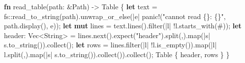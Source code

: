\documentclass[
  10pt,
]{article}
\newenvironment{Shaded}{}{}
\newcommand{\CharTok}[1]{\textcolor[rgb]{0.25,0.44,0.63}{#1}}
\newcommand{\DataTypeTok}[1]{\textcolor[rgb]{0.56,0.13,0.00}{#1}}
\newcommand{\KeywordTok}[1]{\textcolor[rgb]{0.00,0.44,0.13}{\textbf{#1}}}
\newcommand{\NormalTok}[1]{#1}
\newcommand{\OperatorTok}[1]{\textcolor[rgb]{0.40,0.40,0.40}{#1}}
\newcommand{\PreprocessorTok}[1]{\textcolor[rgb]{0.74,0.48,0.00}{#1}}
\newcommand{\StringTok}[1]{\textcolor[rgb]{0.25,0.44,0.63}{#1}}
\begin{document}
\begin{Shaded}
\begin{Highlighting}[]
\KeywordTok{fn}\NormalTok{ read\_table(path}\OperatorTok{:} \OperatorTok{\&}\DataTypeTok{Path}\NormalTok{) }\OperatorTok{{-}\textgreater{}}\NormalTok{ Table }\OperatorTok{\{}
    \KeywordTok{let}\NormalTok{ text }\OperatorTok{=} \PreprocessorTok{fs::}\NormalTok{read\_to\_string(path)}\OperatorTok{.}\NormalTok{unwrap\_or\_else(}\OperatorTok{|}\NormalTok{e}\OperatorTok{|} \PreprocessorTok{panic!}\NormalTok{(}\StringTok{"cannot read \{\}: \{\}"}\OperatorTok{,}\NormalTok{ path}\OperatorTok{.}\NormalTok{display()}\OperatorTok{,}\NormalTok{ e))}\OperatorTok{;}
    \KeywordTok{let} \KeywordTok{mut}\NormalTok{ lines }\OperatorTok{=}\NormalTok{ text}\OperatorTok{.}\NormalTok{lines()}\OperatorTok{.}\NormalTok{filter(}\OperatorTok{|}\NormalTok{l}\OperatorTok{|} \OperatorTok{!}\NormalTok{l}\OperatorTok{.}\NormalTok{starts\_with(}\CharTok{\textquotesingle{}\#\textquotesingle{}}\NormalTok{))}\OperatorTok{;}
    \KeywordTok{let}\NormalTok{ header}\OperatorTok{:} \DataTypeTok{Vec}\OperatorTok{\textless{}}\DataTypeTok{String}\OperatorTok{\textgreater{}} \OperatorTok{=}\NormalTok{ lines}\OperatorTok{.}\NormalTok{next()}\OperatorTok{.}\NormalTok{expect(}\StringTok{"header"}\NormalTok{)}\OperatorTok{.}\NormalTok{split(}\CharTok{\textquotesingle{},\textquotesingle{}}\NormalTok{)}\OperatorTok{.}\NormalTok{map(}\OperatorTok{|}\NormalTok{s}\OperatorTok{|}\NormalTok{ s}\OperatorTok{.}\NormalTok{to\_string())}\OperatorTok{.}\NormalTok{collect()}\OperatorTok{;}
    \KeywordTok{let}\NormalTok{ rows }\OperatorTok{=}\NormalTok{ lines}\OperatorTok{.}\NormalTok{filter(}\OperatorTok{|}\NormalTok{l}\OperatorTok{|} \OperatorTok{!}\NormalTok{l}\OperatorTok{.}\NormalTok{is\_empty())}\OperatorTok{.}\NormalTok{map(}\OperatorTok{|}\NormalTok{l}\OperatorTok{|}\NormalTok{ l}\OperatorTok{.}\NormalTok{split(}\CharTok{\textquotesingle{},\textquotesingle{}}\NormalTok{)}\OperatorTok{.}\NormalTok{map(}\OperatorTok{|}\NormalTok{s}\OperatorTok{|}\NormalTok{ s}\OperatorTok{.}\NormalTok{to\_string())}\OperatorTok{.}\NormalTok{collect())}\OperatorTok{.}\NormalTok{collect()}\OperatorTok{;}
\NormalTok{    Table }\OperatorTok{\{}\NormalTok{ header}\OperatorTok{,}\NormalTok{ rows }\OperatorTok{\}}
\OperatorTok{\}}


\end{Highlighting}
\end{Shaded}
\end{document}
